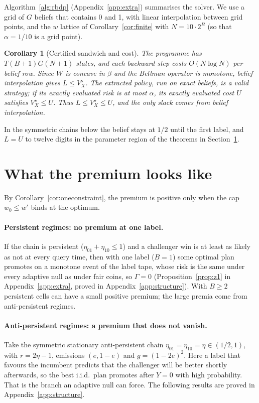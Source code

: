 \documentclass{article}
\theoremstyle{plain}
\newtheorem{corollary}{Corollary}
\theoremstyle{definition}
\theoremstyle{remark}
\begin{document}
Algorithm~\ref{alg:rbdp} (Appendix~\ref{app:extra}) summarises the solver. We use a grid of $G$ beliefs that contains 0 and 1, with linear interpolation between grid points, and the $w$ lattice of Corollary~\ref{cor:finite} with $N=10\cdot 2^B$ (so that $\alpha=1/10$ is a grid point).


\begin{corollary}[Certified sandwich and cost]
\label{cor:sandwich}
The programme has $T(B+1)G(N+1)$ states, and each backward step costs $O(N\log N)$ per belief row. Since $W$ is concave in $\beta$ and the Bellman operator is monotone, belief interpolation gives $L\le V^\star_X$. The extracted policy, run on exact beliefs, is a valid strategy; if its exactly evaluated risk is at most $\alpha$, its exactly evaluated cost $U$ satisfies $V^\star_X\le U$. Thus $L\le V^\star_X\le U$, and the only slack comes from belief interpolation.
\end{corollary}

In the symmetric chains below the belief stays at $1/2$ until the first label, and $L=U$ to twelve digits in the parameter region of the theorems in Section~\ref{sec:premium}.

\section{What the premium looks like}
\label{sec:premium}

By Corollary~\ref{cor:oneconstraint}, the premium is positive only when the cap $w_0\le w'$ binds at the optimum.

\paragraph{Persistent regimes: no premium at one label.} If the chain is persistent ($\eta_{01}+\eta_{10}\le 1$) and a challenger win is at least as likely as not at every query time, then with one label ($B=1$) some optimal plan promotes on a monotone event of the label tape, whose risk is the same under every adaptive null as under fair coins, so $\Gamma=0$ (Proposition~\ref{prop:z1} in Appendix~\ref{app:extra}, proved in Appendix~\ref{app:structure}). With $B\ge 2$ persistent cells can have a small positive premium; the large premia come from anti-persistent regimes.

\paragraph{Anti-persistent regimes: a premium that does not vanish.} Take the symmetric stationary anti-persistent chain $\eta_{01}=\eta_{10}=\eta\in(1/2,1)$, with $r=2\eta-1$, emissions $(e,1-e)$ and $g=(1-2e)^2$. Here a label that favours the incumbent predicts that the challenger will be better shortly afterwards, so the best i.i.d.\ plan promotes after $Y=0$ with high probability. That is the branch an adaptive null can force. The following results are proved in Appendix~\ref{app:structure}.
\end{document}

